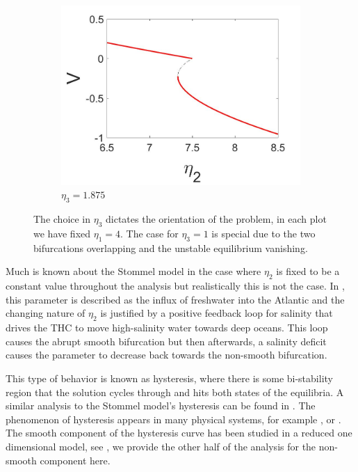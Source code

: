 \begin{figure}[H]
\begin{subfigure}{.5\textwidth}
 \includegraphics[width=\linewidth]{intro/V_bif_reverse.jpg}
 \caption{$\eta_3=1.875$}
\end{subfigure}
\caption{The choice in $\eta_3$ dictates the orientation of the problem, in each plot we have fixed $\eta_1=4$. The case for $\eta_3=1$ is special due to the two bifurcations overlapping and the unstable equilibrium vanishing.}
\label{fig:Stommel_bif_plots}
\end{figure}

Much is known about the Stommel model in the case where $\eta_2$ is fixed to be a constant value throughout the analysis but realistically this is not the case. In \cite{rahmstorf2000thermohaline}, this parameter is described as the influx of freshwater into the Atlantic and the changing nature of $\eta_2$ is justified by a positive feedback loop for salinity that drives the THC to move high-salinity water towards deep oceans. This loop causes the abrupt smooth bifurcation but then afterwards, a salinity deficit causes the parameter to decrease back towards the non-smooth bifurcation.

This type of behavior is known as hysteresis, where there is some bi-stability region that the solution cycles through and hits both states of the equilibria. A similar analysis to the Stommel model's hysteresis can be found in \cite{roberts2017relaxation}. The phenomenon of hysteresis appears in many physical systems, for example \cite{jung1990scaling}, \cite{hohl1995scaling} or \cite{joshi2005dynamical}. The smooth component of the hysteresis curve has been studied in a reduced one dimensional model, see \cite{zhu2015tipping}, we provide the other half of the analysis for the non-smooth component here.

